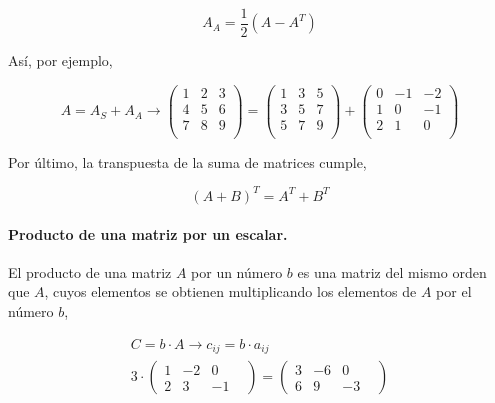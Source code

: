 \begin{equation*}
A_A=\frac{1}{2}\left( A-A^T \right)
\end{equation*}
\begin{paracol}{2}
Así, por ejemplo,
\end{paracol}
\begin{equation*}
 A=A_S+A_A \rightarrow
\begin{pmatrix}
1& 2& 3\\
4& 5& 6\\
7& 8& 9\\
\end{pmatrix} =
\begin{pmatrix}
1& 3& 5\\
3& 5& 7\\
5& 7& 9\\
\end{pmatrix} +
\begin{pmatrix}
0& -1& -2\\
1& 0& -1\\
2& 1& 0\\
\end{pmatrix}
\end{equation*}
\begin{paracol}{2}
Por último, la transpuesta de la suma de matrices cumple,
\end{paracol}

\begin{equation*}
(A+B)^T=A^T+B^T
\end{equation*}

\begin{paracol}{2}
\paragraph{Producto de una matriz por un escalar.} El producto de una matriz $A$ por un número $b$ es una matriz del mismo orden que $A$, cuyos elementos se obtienen multiplicando los elementos de $A$ por el número $b$,
\end{paracol}
\begin{gather*}
C=b\cdot A \rightarrow c_{ij}=b\cdot a_{ij}\\
3\cdot
\begin{pmatrix}
1& -2& 0\\
2& 3& -1&
\end{pmatrix}=
\begin{pmatrix}
3& -6& 0\\
6& 9& -3&
\end{pmatrix} 
\end{gather*}

